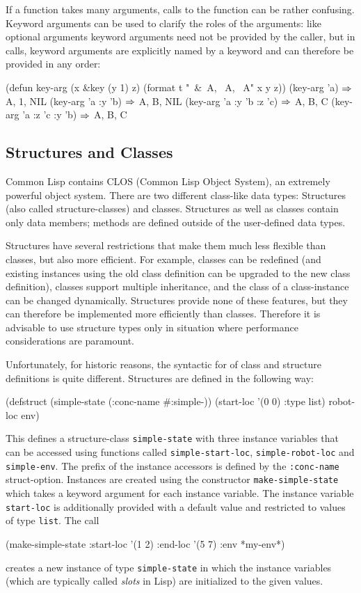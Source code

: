 \documentclass[a4paper]{amsart}
\begin{document}
If a function takes many arguments, calls to the function can be
rather confusing.  Keyword arguments can be used to clarify the roles
of the arguments: like optional arguments keyword arguments need not
be provided by the caller, but in calls, keyword arguments are
explicitly named by a keyword and can therefore be provided in any
order:
\begin{Code}
  (defun key-arg (x &key (y 1) z)
    (format t "~&~A, ~A, ~A" x y z))
  (key-arg 'a)                    $\Rightarrow$ A, 1, NIL
  (key-arg 'a :y 'b)              $\Rightarrow$ A, B, NIL 
  (key-arg 'a :y 'b :z 'c)        $\Rightarrow$ A, B, C 
  (key-arg 'a :z 'c :y 'b)        $\Rightarrow$ A, B, C 
\end{Code}

\subsection{Structures and Classes}
\label{sec:structs-classes}

Common Lisp contains CLOS (Common Lisp Object System), an extremely
powerful object system.  There are two different class-like data
types: Structures (also called structure-classes) and classes.
Structures as well as classes contain only data members; methods are
defined outside of the user-defined data types.

Structures have several restrictions that make them much less flexible
than classes, but also more efficient.  For example, classes can be
redefined (and existing instances using the old class definition can
be upgraded to the new class definition), classes support multiple
inheritance, and the class of a class-instance can be changed
dynamically.  Structures provide none of these features, but they can
therefore be implemented more efficiently than classes.  Therefore it
is advisable to use structure types only in situation where
performance considerations are paramount.

Unfortunately, for historic reasons, the syntactic for of class and
structure definitions is quite different.  Structures are defined in
the following way:
\begin{Code}
  (defstruct (simple-state (:conc-name #:simple-))
    (start-loc '(0 0) :type list)
    robot-loc
    env)  
\end{Code}
This defines a structure-class \texttt{simple-state} with three
instance variables that can be accessed using functions called
\texttt{simple-start-loc}, \texttt{simple-robot-loc} and
\texttt{simple-env}.  The prefix of the instance accessors is defined
by the \texttt{:conc-name} struct-option.  Instances are created using
the constructor \texttt{make-simple-state} which takes a keyword
argument for each instance variable.  The instance variable
\texttt{start-loc} is additionally provided with a default value and
restricted to values of type \texttt{list}.  The call
\begin{Code}
  (make-simple-state :start-loc '(1 2) :end-loc '(5 7) :env *my-env*)
\end{Code}
creates a new instance of type \texttt{simple-state} in which the
instance variables (which are typically called \emph{slots} in Lisp)
are initialized to the given values.
\end{document}

